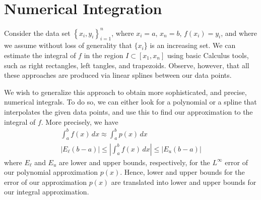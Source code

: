 \documentclass[12pt,reqno]{amsart}
\numberwithin{equation}{section}  %
\begin{document}
\section{Numerical Integration}
Consider the data set $ \left\{ x_i, y_i \right\}_{i=1}^{n}$, where $x_i = a$,
$x_n = b$, $f(x_i) = y_i$,
and where we assume without loss of generality that $\{x_i$\} is an
increasing set. We can estimate the integral of $f$ in the region $I \subset [x_1, x_n]$
using basic Calculus tools, such as right rectangles, left tangles, and trapezoids.
Observe, however, that all these approaches are produced via linear splines
between our data points. 

We wish to generalize this approach to obtain more sophisticated, and precise,
numerical integrals. To do so, we can either look for a polynomial or a spline
that interpolates the given data points, and use this to find our approximation
to the integral of $f$. More precisely, we have 
\begin{align*}
\int_a^b f(x)\, dx \approx \int_a^b p(x)\, dx
\\
|E_\ell(b-a)| \le | \int_a^b f(x) \, dx| \le |E_u (b-a)|
\end{align*}
where $E_\ell$ and $E_u$ are lower and upper bounds, respectively, for the $L^\infty$
error of our polynomial approximation $p(x)$. Hence, lower and upper bounds for the error of our approximation $p(x)$
are translated into lower and upper bounds for our integral approximation.
\end{document}
